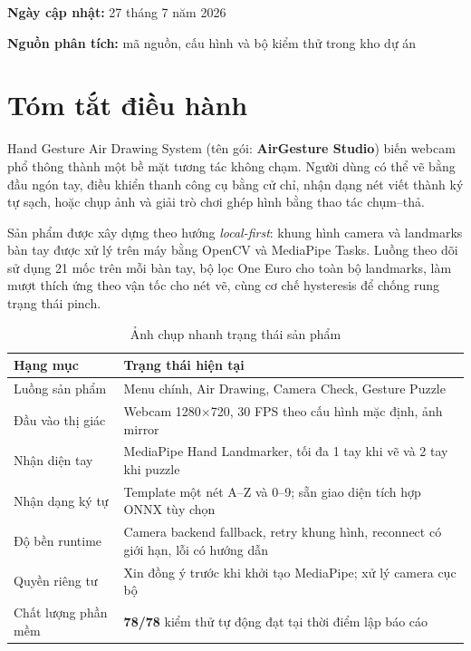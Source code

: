 \documentclass[12pt,a4paper,oneside]{report}
\begin{document}
\begin{titlepage}
\vfill
{\sffamily\color{Slate}
\textbf{Ngày cập nhật:} 27 tháng 7 năm 2026\par
\textbf{Nguồn phân tích:} mã nguồn, cấu hình và bộ kiểm thử trong kho dự án\par}
\end{titlepage}

\tableofcontents
\clearpage

\chapter*{Tóm tắt điều hành}

\begin{greenbox}
Hand Gesture Air Drawing System (tên gói: \textbf{AirGesture Studio}) biến webcam phổ thông thành một bề mặt tương tác không chạm. Người dùng có thể vẽ bằng đầu ngón tay, điều khiển thanh công cụ bằng cử chỉ, nhận dạng nét viết thành ký tự sạch, hoặc chụp ảnh và giải trò chơi ghép hình bằng thao tác chụm--thả.
\end{greenbox}

Sản phẩm được xây dựng theo hướng \textit{local-first}: khung hình camera và landmarks bàn tay được xử lý trên máy bằng OpenCV và MediaPipe Tasks. Luồng theo dõi sử dụng 21 mốc trên mỗi bàn tay, bộ lọc One Euro cho toàn bộ landmarks, làm mượt thích ứng theo vận tốc cho nét vẽ, cùng cơ chế hysteresis để chống rung trạng thái pinch.

\begin{table}[H]
\centering
\caption{Ảnh chụp nhanh trạng thái sản phẩm}
\begin{tabularx}{\textwidth}{L{40mm}Y}
\toprule
\textbf{Hạng mục} & \textbf{Trạng thái hiện tại}\\
\midrule
Luồng sản phẩm & Menu chính, Air Drawing, Camera Check, Gesture Puzzle\\
Đầu vào thị giác & Webcam 1280$\times$720, 30 FPS theo cấu hình mặc định, ảnh mirror\\
Nhận diện tay & MediaPipe Hand Landmarker, tối đa 1 tay khi vẽ và 2 tay khi puzzle\\
Nhận dạng ký tự & Template một nét A--Z và 0--9; sẵn giao diện tích hợp ONNX tùy chọn\\
Độ bền runtime & Camera backend fallback, retry khung hình, reconnect có giới hạn, lỗi có hướng dẫn\\
Quyền riêng tư & Xin đồng ý trước khi khởi tạo MediaPipe; xử lý camera cục bộ\\
Chất lượng phần mềm & \textbf{78/78} kiểm thử tự động đạt tại thời điểm lập báo cáo\\
\bottomrule
\end{tabularx}
\end{table}
\end{document}
